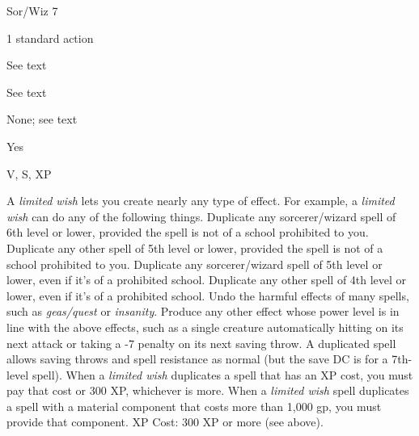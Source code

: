 
\begin{description*}
\item[Level:] Sor/Wiz 7
\item[Casting Time:] 1 standard action
\item[Range:] See text
\item[Duration:] See text
\item[Saving Throw:] None; see text
\item[Spell Resistance:] Yes
\item[Components:] V, S, XP
\end{description*}

A \textit{limited wish} lets you create nearly any type of effect. For example,
a \textit{limited wish} can do any of the following things.%
Duplicate any sorcerer/wizard spell of 6th level or lower, provided the spell is
not of a school prohibited to you.%
Duplicate any other spell of 5th level or lower, provided the spell is not of a
school prohibited to you.%
Duplicate any sorcerer/wizard spell of 5th level or lower, even if it's of a prohibited
school.%
Duplicate any other spell of 4th level or lower, even if it's of a prohibited school.%
Undo the harmful effects of many spells, such as \textit{geas/quest} or \textit{insanity}.%
Produce any other effect whose power level is in line with the above effects, such
as a single creature automatically hitting on its next attack or taking a -7 penalty
on its next saving throw.
A duplicated spell allows saving throws and spell resistance as normal (but the
save DC is for a 7th-level spell). When a \textit{limited wish} duplicates a spell
that has an XP cost, you must pay that cost or 300 XP, whichever is more. When
a \textit{limited wish} spell duplicates a spell with a material component that
costs more than 1,000 gp, you must provide that component.
XP Cost: 300 XP or more (see above).